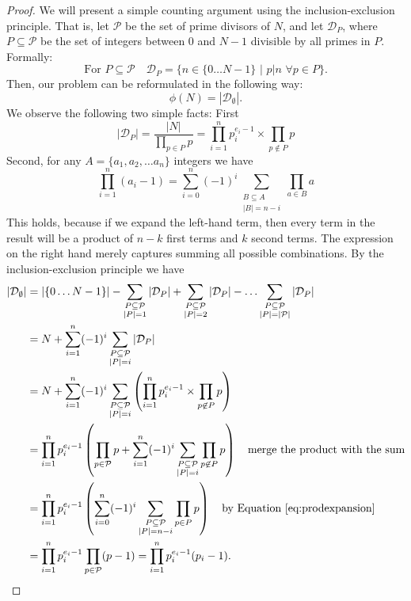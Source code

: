 \documentclass{article}
\theoremstyle{definition}
\theoremstyle{example}
\newcommand{\D}{\mathcal{D}}
\renewcommand{\P}{\mathcal{P}}
\begin{document}
\begin{proof}
  We will present a simple counting argument using the inclusion-exclusion
  principle. That is, let $\P$ be the set of prime divisors of $N$, and
  let $\D_P$, where $P \subseteq \P$ be the set of integers
  between $0$ and $N - 1$ divisible by all primes in $P$. Formally:
  \[
    \text{For } P \subseteq \P \quad \D_P = \{n \in \{0 \hdots
    N - 1\}\,\,|\,\,p | n\,\,\forall p \in P\}.
  \]
  Then, our problem can be reformulated in the following way:
  \[
    \phi(N) = |\D_\emptyset|.
  \]
  We observe the following two simple facts: First
  \[
    |\D_P| = \frac{|N|}{\prod_{p \in P}p} = \prod_{i = 1}^n p_i^{e_i -
      1} \times \prod_{p \not\in P}p
  \]
  Second, for any $A = \{a_1, a_2, \hdots a_n\}$ integers we have
  \begin{equation}
    \label{eq:prodexpansion}
    \prod_{i = 1}^n (a_i - 1) = \sum_{i = 0}^n (-1)^i
 \sum_{\substack{B \subseteq A \\ |B| = n - i}} \prod_{a \in B}a
  \end{equation}
  This holds, because if we expand the left-hand term, then every term in the
  result will be a product of $n - k$ first terms and $k$ second terms. The
  expression on the right hand merely captures summing all possible combinations.
  By the inclusion-exclusion principle we have
  \begin{align*}
    |\D_\emptyset| &= |\{0 \hdots N-1\}| - \sum_{\substack{P \subseteq \P \\ |P| =
        1}} |\D_P| + \sum_{\substack{P \subseteq \P \\ |P| =
        2}} |\D_P| - \hdots \sum_{\substack{P \subseteq \P \\ |P| =
    |\P|}} |\D_P| \\
                   &= N + \sum_{i = 1}^n (-1)^i \sum_{\substack{P \subseteq \P \\ |P| =
    i}} |\D_P| \\
                   &= N + \sum_{i = 1}^n (-1)^i \sum_{\substack{P \subseteq \P \\ |P| =
        i}} \left(  \prod_{i = 1}^n p_i^{e_i - 1} \times \prod_{p \not\in P}p \right)\\
                   &= \prod_{i = 1}^n p_i^{e_i - 1} \left( \prod_{p\in\P}p +  \sum_{i = 1}^n (-1)^i \sum_{\substack{P \subseteq \P \\ |P| =
    i}} \prod_{p \not\in P}p \right) \quad \text{merge the product with the sum}\\
                   &= \prod_{i = 1}^n p_i^{e_i - 1} \left( \sum_{i = 0}^n (-1)^i
 \sum_{\substack{P \subseteq \P \\ |P| = n - i}} \prod_{p \in P}p \right) \quad\text{by Equation \ref{eq:prodexpansion}}\\
                   &=\prod_{i = 1}^n p_i^{e_i - 1}\prod_{p \in \P} (p - 1) = \prod_{i = 1}^n p_i^{e_i - 1}(p_i - 1).
 \end{align*}
\end{proof}
\end{document}
